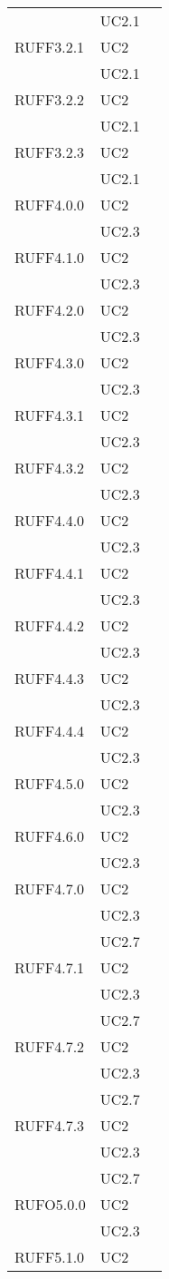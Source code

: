 \begin{center}
\begin{longtable}{lp{}l}
 & UC2.1 \\
RUFF3.2.1 & UC2 \\
 & UC2.1 \\
RUFF3.2.2 & UC2 \\
 & UC2.1 \\
RUFF3.2.3 & UC2 \\
 & UC2.1 \\
RUFF4.0.0 & UC2 \\
 & UC2.3 \\
RUFF4.1.0 & UC2 \\
 & UC2.3 \\
RUFF4.2.0 & UC2 \\
 & UC2.3 \\
RUFF4.3.0 & UC2 \\
 & UC2.3 \\
RUFF4.3.1 & UC2 \\
 & UC2.3 \\
RUFF4.3.2 & UC2 \\
 & UC2.3 \\
RUFF4.4.0 & UC2 \\
 & UC2.3 \\
RUFF4.4.1 & UC2 \\
 & UC2.3 \\
RUFF4.4.2 & UC2 \\
 & UC2.3 \\
RUFF4.4.3 & UC2 \\
 & UC2.3 \\
RUFF4.4.4 & UC2 \\
 & UC2.3 \\
RUFF4.5.0 & UC2 \\
 & UC2.3 \\
RUFF4.6.0 & UC2 \\
 & UC2.3 \\
RUFF4.7.0 & UC2 \\
 & UC2.3 \\
 & UC2.7 \\
RUFF4.7.1 & UC2 \\
 & UC2.3 \\
 & UC2.7 \\
RUFF4.7.2 & UC2 \\
 & UC2.3 \\
 & UC2.7 \\
RUFF4.7.3 & UC2 \\
 & UC2.3 \\
 & UC2.7 \\
RUFO5.0.0 & UC2 \\
 & UC2.3 \\
RUFF5.1.0 & UC2 \\

\end{longtable}
\end{center}
